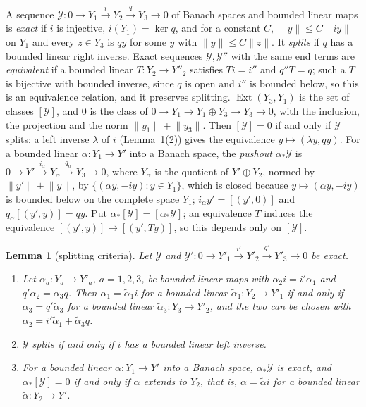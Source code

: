 \documentclass[11pt]{amsart}
\newtheorem{lemma}[theorem]{Lemma}
\theoremstyle{definition}
\theoremstyle{remark}
\numberwithin{equation}{section}
\newcommand{\norm}[1]{\lVert #1\rVert}
\theoremstyle{plain}
\theoremstyle{definition}
\theoremstyle{plain}
\newcommand{\Ext}{\operatorname{Ext}}
\begin{document}
A sequence $\mathcal Y\colon0\to Y_1\xrightarrow{i}Y_2\xrightarrow{q}Y_3\to0$ of Banach spaces and bounded linear maps is
\emph{exact} if $i$ is injective, $i(Y_1)=\ker q$, and for a constant $C$, $\norm y\le C\norm{iy}$ on $Y_1$ and every
$z\in Y_3$ is $qy$ for some $y$ with $\norm y\le C\norm z$. It \emph{splits} if $q$ has a bounded linear right inverse.
Exact sequences $\mathcal Y,\mathcal Y''$ with the same end terms are \emph{equivalent} if a bounded linear
$T\colon Y_2\to Y''_2$ satisfies $Ti=i''$ and $q''T=q$; such a $T$ is bijective with bounded inverse, since $q$ is open and
$i''$ is bounded below, so this is an equivalence relation, and it preserves splitting. $\Ext(Y_3,Y_1)$ is the set of
classes $[\mathcal Y]$, and $0$ is the class of $0\to Y_1\to Y_1\oplus Y_3\to Y_3\to0$, with the inclusion, the projection
and the norm $\norm{y_1}+\norm{y_3}$. Then $[\mathcal Y]=0$ if and only if $\mathcal Y$ splits: a left inverse $\lambda$ of
$i$ (Lemma~\ref{ob:lem:split-criteria}(2)) gives the equivalence $y\mapsto(\lambda y,qy)$. For a bounded linear
$\alpha\colon Y_1\to Y'$ into a Banach space, the \emph{pushout} $\alpha_*\mathcal Y$ is
$0\to Y'\xrightarrow{i_\alpha}Y_\alpha\xrightarrow{q_\alpha}Y_3\to0$, where $Y_\alpha$ is the quotient of $Y'\oplus Y_2$,
normed by $\norm{y'}+\norm y$, by $\{(\alpha y,-iy):y\in Y_1\}$, which is closed because $y\mapsto(\alpha y,-iy)$ is
bounded below on the complete space $Y_1$; $i_\alpha y'=[(y',0)]$ and $q_\alpha[(y',y)]=qy$. Put
$\alpha_*[\mathcal Y]=[\alpha_*\mathcal Y]$; an equivalence $T$ induces the equivalence $[(y',y)]\mapsto[(y',Ty)]$, so
this depends only on $[\mathcal Y]$.

\begin{lemma}[splitting criteria]\label{ob:lem:split-criteria}
Let $\mathcal Y$ and $\mathcal Y'\colon0\to Y'_1\xrightarrow{i'}Y'_2\xrightarrow{q'}Y'_3\to0$ be exact.
\begin{enumerate}
\item Let $\alpha_a\colon Y_a\to Y'_a$, $a=1,2,3$, be bounded linear maps with $\alpha_2i=i'\alpha_1$ and
$q'\alpha_2=\alpha_3q$. Then $\alpha_1=\tilde\alpha_1i$ for a bounded linear $\tilde\alpha_1\colon Y_2\to Y'_1$ if and only
if $\alpha_3=q'\tilde\alpha_3$ for a bounded linear $\tilde\alpha_3\colon Y_3\to Y'_2$, and the two can be chosen with
$\alpha_2=i'\tilde\alpha_1+\tilde\alpha_3q$.
\item $\mathcal Y$ splits if and only if $i$ has a bounded linear left inverse.
\item For a bounded linear $\alpha\colon Y_1\to Y'$ into a Banach space, $\alpha_*\mathcal Y$ is exact, and
$\alpha_*[\mathcal Y]=0$ if and only if $\alpha$ extends to $Y_2$, that is, $\alpha=\tilde\alpha i$ for a bounded linear
$\tilde\alpha\colon Y_2\to Y'$.
\end{enumerate}
\end{lemma}
\end{document}
